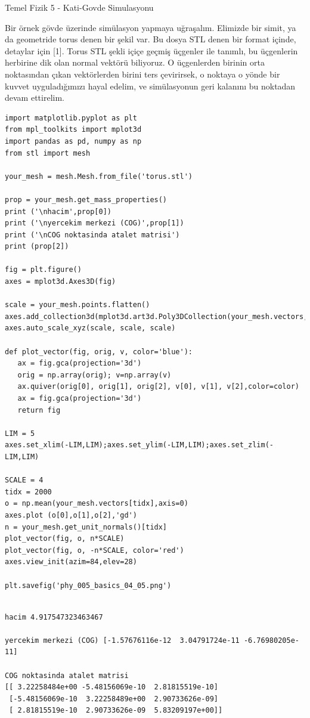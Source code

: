 \documentclass[12pt,fleqn]{article}\usepackage{../../common}
\begin{document}
Temel Fizik 5 - Kati-Govde Simulasyonu

Bir örnek gövde üzerinde simülasyon yapmaya uğraşalım. Elimizde bir simit, ya da
geometride torus denen bir şekil var. Bu dosya STL denen bir format içinde,
detaylar için [1]. Torus STL şekli içiçe geçmiş üçgenler ile tanımlı, bu
üçgenlerin herbirine dik olan normal vektörü biliyoruz. O üçgenlerden birinin
orta noktasından çıkan vektörlerden birini ters çevirirsek, o noktaya o yönde
bir kuvvet uyguladığımızı hayal edelim, ve simülasyonun geri kalanını bu
noktadan devam ettirelim.

\begin{verbatim}
import matplotlib.pyplot as plt
from mpl_toolkits import mplot3d
import pandas as pd, numpy as np
from stl import mesh

your_mesh = mesh.Mesh.from_file('torus.stl')

prop = your_mesh.get_mass_properties()
print ('\nhacim',prop[0])
print ('\nyercekim merkezi (COG)',prop[1])
print ('\nCOG noktasinda atalet matrisi')
print (prop[2])

fig = plt.figure()
axes = mplot3d.Axes3D(fig)

scale = your_mesh.points.flatten()
axes.add_collection3d(mplot3d.art3d.Poly3DCollection(your_mesh.vectors,alpha=0.3))
axes.auto_scale_xyz(scale, scale, scale)

def plot_vector(fig, orig, v, color='blue'):
   ax = fig.gca(projection='3d')
   orig = np.array(orig); v=np.array(v)
   ax.quiver(orig[0], orig[1], orig[2], v[0], v[1], v[2],color=color)
   ax = fig.gca(projection='3d')  
   return fig

LIM = 5
axes.set_xlim(-LIM,LIM);axes.set_ylim(-LIM,LIM);axes.set_zlim(-LIM,LIM)

SCALE = 4
tidx = 2000
o = np.mean(your_mesh.vectors[tidx],axis=0)
axes.plot (o[0],o[1],o[2],'gd')
n = your_mesh.get_unit_normals()[tidx]
plot_vector(fig, o, n*SCALE)
plot_vector(fig, o, -n*SCALE, color='red')
axes.view_init(azim=84,elev=28)

plt.savefig('phy_005_basics_04_05.png')
\end{verbatim}

\begin{verbatim}

hacim 4.917547323463467

yercekim merkezi (COG) [-1.57676116e-12  3.04791724e-11 -6.76980205e-11]

COG noktasinda atalet matrisi
[[ 3.22258484e+00 -5.48156069e-10  2.81815519e-10]
 [-5.48156069e-10  3.22258489e+00  2.90733626e-09]
 [ 2.81815519e-10  2.90733626e-09  5.83209197e+00]]
\end{verbatim}
\end{document}
